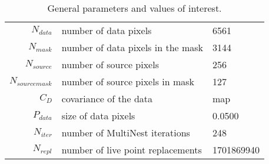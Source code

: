 \begin{table*}[!htb]\caption{General parameters and values of interest.}\begin{center}\begin{tabular}{ r l l }\hline $N_{data}$        & number of data pixels             & 6561 \\ 
 $N_{mask}$        & number of data pixels in the mask & 3144 \\ 
 $N_{source}$      & number of source pixels           & 256 \\ 
 $N_{source mask}$ & number of source pixels in mask   & 127 \\ 
 $C_D$        & covariance of the data            & map \\ 
 $P_{data}$   & size of data pixels               &     0.0500 \\ 
\hline  $N_{iter}$   & number of MultiNest iterations    & 248 \\ 
 $N_{repl}$   & number of live point replacements & 1701869940 \\ 
\hline\end{tabular}\end{center}\label{tab:3}\end{table*}